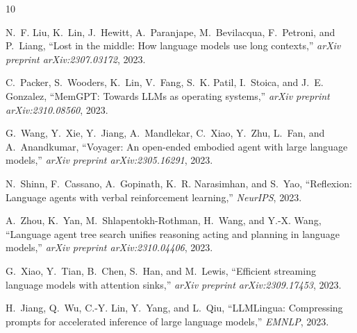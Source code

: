 \documentclass[conference]{IEEEtran}
\begin{document}

\begin{thebibliography}{10}

N.~F. Liu, K.~Lin, J.~Hewitt, A.~Paranjape, M.~Bevilacqua, F.~Petroni, and P.~Liang, ``Lost in the middle: How language models use long contexts,'' \textit{arXiv preprint arXiv:2307.03172}, 2023.

C.~Packer, S.~Wooders, K.~Lin, V.~Fang, S.~K. Patil, I.~Stoica, and J.~E. Gonzalez, ``MemGPT: Towards LLMs as operating systems,'' \textit{arXiv preprint arXiv:2310.08560}, 2023.

G.~Wang, Y.~Xie, Y.~Jiang, A.~Mandlekar, C.~Xiao, Y.~Zhu, L.~Fan, and A.~Anandkumar, ``Voyager: An open-ended embodied agent with large language models,'' \textit{arXiv preprint arXiv:2305.16291}, 2023.

N.~Shinn, F.~Cassano, A.~Gopinath, K.~R. Narasimhan, and S.~Yao, ``Reflexion: Language agents with verbal reinforcement learning,'' \textit{NeurIPS}, 2023.

A.~Zhou, K.~Yan, M.~Shlapentokh-Rothman, H.~Wang, and Y.-X. Wang, ``Language agent tree search unifies reasoning acting and planning in language models,'' \textit{arXiv preprint arXiv:2310.04406}, 2023.

G.~Xiao, Y.~Tian, B.~Chen, S.~Han, and M.~Lewis, ``Efficient streaming language models with attention sinks,'' \textit{arXiv preprint arXiv:2309.17453}, 2023.

H.~Jiang, Q.~Wu, C.-Y. Lin, Y.~Yang, and L.~Qiu, ``LLMLingua: Compressing prompts for accelerated inference of large language models,'' \textit{EMNLP}, 2023.

\end{thebibliography}
\end{document}
